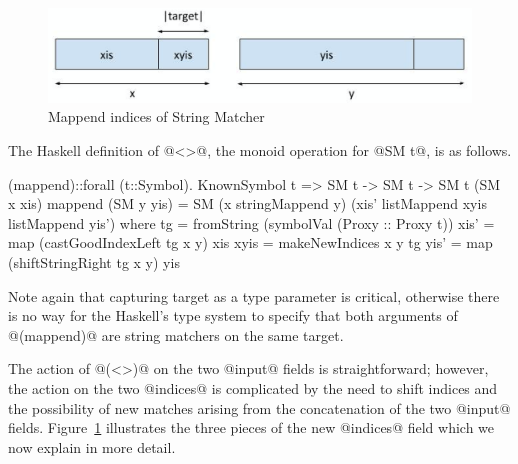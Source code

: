\begin{figure}[t]
\includegraphics[scale=0.5]{makeIndices}
\caption{Mappend indices of String Matcher}
\label{fig:mappend:indices}
\end{figure}
%
The Haskell definition of @<>@, the monoid operation for @SM t@, is as follows.
\begin{code}
(mappend)::forall (t::Symbol). KnownSymbol t => SM t -> SM t -> SM t
(SM x xis) mappend (SM y yis)
  = SM (x stringMappend y) (xis' listMappend xyis listMappend yis')
  where
    tg   = fromString (symbolVal (Proxy :: Proxy t))
    xis' = map (castGoodIndexLeft tg x y) xis
    xyis = makeNewIndices x y tg
    yis' = map (shiftStringRight tg x y) yis
\end{code}
Note again that capturing target as a type parameter is critical,
otherwise there is no way for the Haskell's type system to specify
that both arguments of @(mappend)@ are string matchers on the same target.

The action of @(<>)@ on the two @input@ fields is straightforward;
however, the action on the two @indices@ is complicated by the need to
shift indices and the possibility of new matches arising from the
concatenation of the two @input@
fields. Figure~\ref{fig:mappend:indices} illustrates the three pieces
of the new @indices@ field which we now explain in more detail.

